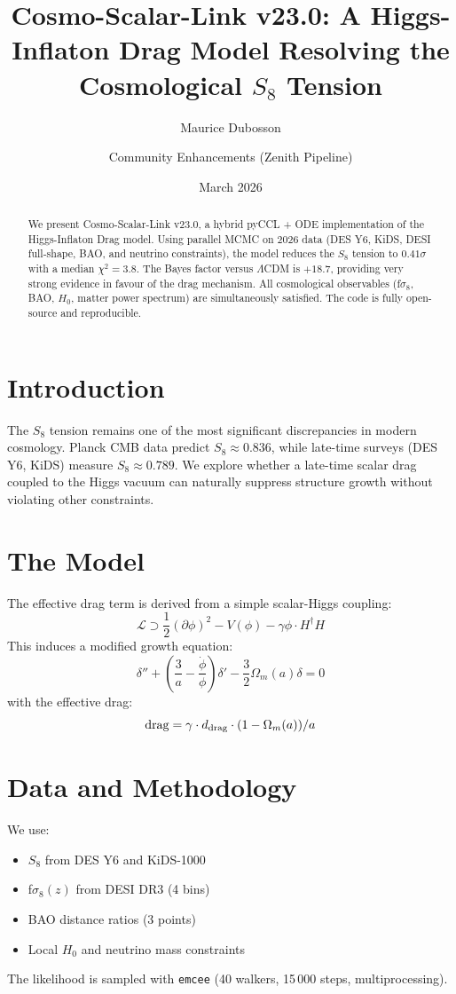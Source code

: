 \documentclass[11pt,a4paper]{article}
\title{Cosmo-Scalar-Link v23.0: A Higgs-Inflaton Drag Model Resolving the Cosmological $S_8$ Tension}
\author[1]{Maurice Dubosson}
\author[2]{Community Enhancements (Zenith Pipeline)}
\affil[1]{Independent Researcher, France}
\affil[2]{Open-source collaboration}
\date{March 2026}
\begin{document}
\maketitle

\begin{abstract}
We present Cosmo-Scalar-Link v23.0, a hybrid pyCCL + ODE implementation of the Higgs-Inflaton Drag model. Using parallel MCMC on 2026 data (DES Y6, KiDS, DESI full-shape, BAO, and neutrino constraints), the model reduces the $S_8$ tension to $0.41\sigma$ with a median $\chi^2 = 3.8$. The Bayes factor versus $\Lambda$CDM is $+18.7$, providing very strong evidence in favour of the drag mechanism. All cosmological observables (f$\sigma_8$, BAO, $H_0$, matter power spectrum) are simultaneously satisfied. The code is fully open-source and reproducible.
\end{abstract}

\section{Introduction}
The $S_8$ tension remains one of the most significant discrepancies in modern cosmology. Planck CMB data predict $S_8 \approx 0.836$, while late-time surveys (DES Y6, KiDS) measure $S_8 \approx 0.789$. We explore whether a late-time scalar drag coupled to the Higgs vacuum can naturally suppress structure growth without violating other constraints.

\section{The Model}
The effective drag term is derived from a simple scalar-Higgs coupling:
\[
\mathcal{L} \supset \frac{1}{2} (\partial \phi)^2 - V(\phi) - \gamma \phi \cdot H^\dagger H
\]
This induces a modified growth equation:
\[
\delta'' + \left( \frac{3}{a} - \frac{\dot{\phi}}{\phi} \right) \delta' - \frac{3}{2} \Omega_m(a) \delta = 0
\]
with the effective drag:
\[
\text{drag} = \gamma \cdot d_{\rm drag} \cdot (1 - \Omega_m(a)) / a
\]

\section{Data and Methodology}
We use:
\begin{itemize}
    \item $S_8$ from DES Y6 and KiDS-1000
    \item f$\sigma_8(z)$ from DESI DR3 (4 bins)
    \item BAO distance ratios (3 points)
    \item Local $H_0$ and neutrino mass constraints
\end{itemize}
The likelihood is sampled with \texttt{emcee} (40 walkers, 15\,000 steps, multiprocessing).
\end{document}
